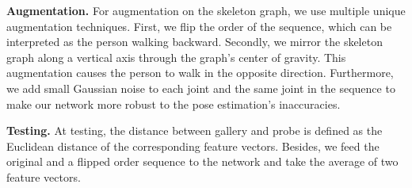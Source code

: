\documentclass{article}
\newcommand{\nparagraph}[1]{\noindent\textbf{#1.  }}
\begin{document}
\nparagraph{Augmentation} For augmentation on the skeleton graph, we use multiple unique augmentation techniques. First, we flip the order of the sequence, which can be interpreted as the person walking backward. Secondly, we mirror the skeleton graph along a vertical axis through the graph's center of gravity. This augmentation causes the person to walk in the opposite direction. Furthermore, we add small Gaussian noise to each joint and the same joint in the sequence to make our network more robust to the pose estimation's inaccuracies.

\nparagraph{Testing} At testing, the distance between gallery and probe is defined as the Euclidean distance of the corresponding feature vectors. Besides, we feed the original and a flipped order sequence to the network and take the average of two feature vectors.
\end{document}
